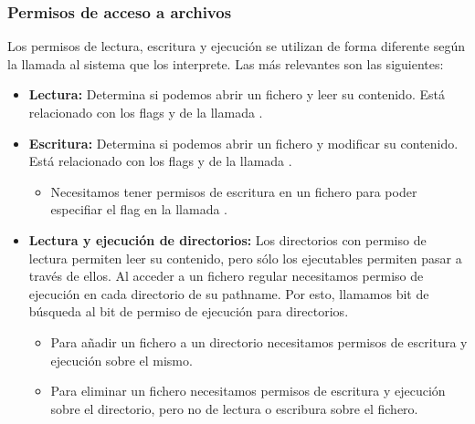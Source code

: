\subsubsection{Permisos de acceso a archivos}

Los permisos de lectura, escritura y ejecución se utilizan de forma diferente según la llamada al sistema que los interprete.
Las más relevantes son las siguientes:

\begin{itemize}
	\item\textbf{Lectura:} Determina si podemos abrir un fichero y leer su contenido. Está relacionado con los flags  y  de la llamada .
	\item\textbf{Escritura:} Determina si podemos abrir un fichero y modificar su contenido. Está relacionado con los flags  y  de la llamada .
	\begin{itemize}
		\item Necesitamos tener permisos de escritura en un fichero para poder especifiar el flag  en la llamada .
	\end{itemize}
	\item\textbf{Lectura y ejecución de directorios:} Los directorios con permiso de lectura permiten leer su contenido, pero sólo los ejecutables permiten pasar a través de ellos. Al acceder a un fichero regular necesitamos permiso de ejecución en cada directorio de su pathname. Por esto, llamamos bit de búsqueda al bit de permiso de ejecución para directorios.
	\begin{itemize}
		\item Para añadir un fichero a un directorio necesitamos permisos de escritura y ejecución sobre el mismo.
		\item Para eliminar un fichero necesitamos permisos de escritura y ejecución sobre el directorio, pero no de lectura o escribura sobre el fichero.
	\end{itemize}
\end{itemize}


